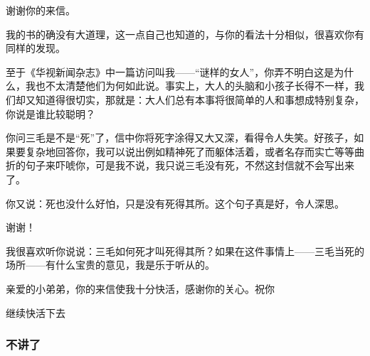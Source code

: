 \par {}
\par 谢谢你的来信。
\par 我的书的确没有大道理，这一点自己也知道的，与你的看法十分相似，很喜欢你有同样的发现。
\par 至于《华视新闻杂志》中一篇访问叫我——“谜样的女人”，你弄不明白这是为什么，我也不太清楚他们为何如此说。事实上，大人的头脑和小孩子长得不一样，我们却又知道得很切实，那就是：大人们总有本事将很简单的人和事想成特别复杂，你说是谁比较聪明？
\par 你问三毛是不是“死”了，信中你将死字涂得又大又深，看得令人失笑。好孩子，如果要复杂地回答你，我可以说出例如精神死了而躯体活着，或者名存而实亡等等曲折的句子来吓唬你，可是我不说，我只说三毛没有死，不然这封信就不会写出来了。
\par 你又说：死也没什么好怕，只是没有死得其所。这个句子真是好，令人深思。
\par 谢谢！
\par 我很喜欢听你说说：三毛如何死才叫死得其所？如果在这件事情上——三毛当死的场所——有什么宝贵的意见，我是乐于听从的。
\par 亲爱的小弟弟，你的来信使我十分快活，感谢你的关心。祝你
\par 继续快活下去
\par {}

\subsubsection{不讲了}


